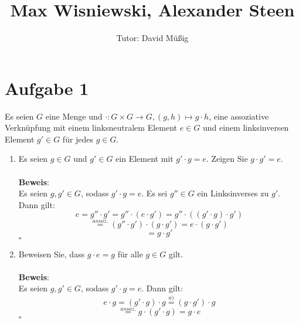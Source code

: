 \documentclass[11pt,a4paper,ngerman]{article}
\author{Tutor: David Müßig}
\date{}
\title{Max Wisniewski, Alexander Steen}
\begin{document}

\maketitle
\thispagestyle{fancy}

\section*{Aufgabe 1}

Es seien $G$ eine Menge und $\cdot : G \times G \to G, (g,h) \mapsto g \cdot h$, eine assoziative Verknüpfung mit einem linksneutralem Element $e \in G$ und einem linksinversen Element $g' \in G$ für jedes $g \in G$.

\begin{enumerate}[\bfseries a)]
\item Es seien $g \in G$ und $g' \in G$ ein Element mit $g' \cdot g = e$. Zeigen Sie $g \cdot g' = e$.
\\ \\
\textbf{Beweis}: \\
Es seien $g,g' \in G$, sodass $g' \cdot g = e$. Es sei $g'' \in G$ ein Linksinverses zu $g'$. Dann gilt: \\
$$ e = g'' \cdot g' = g'' \cdot (e \cdot g') = g'' \cdot ((g' \cdot g) \cdot g') $$
$$ \stackrel{assoz.}{=} (g'' \cdot g') \cdot (g \cdot g') = e \cdot (g \cdot g') $$
$$ = g \cdot g' $$
\mbox{} \hfill $\square$
\item Beweisen Sie, dass $g \cdot e = g$ für alle $g \in G$ gilt.
\\ \\
\textbf{Beweis}: \\
Es seien $g,g' \in G$, sodass $g' \cdot g = e$. Dann gilt: \\
$$ e \cdot g = (g' \cdot g) \cdot g \stackrel{a)}{=} (g \cdot g') \cdot g $$
$$ \stackrel{assoz.}{=} g \cdot (g' \cdot g) = g \cdot e $$
\mbox{} \hfill $\square$
\end{enumerate}
\end{document}
